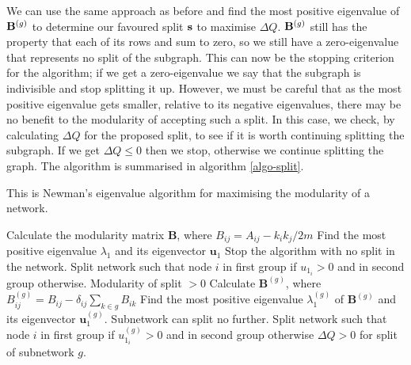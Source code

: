 We can use the same approach as before and find the most
positive eigenvalue of ${\bf B}^{(g)}$ to determine our favoured split
${\bf s}$ to maximise $\Delta Q$. ${\bf B}^{(g)}$ still has the
property that each of its rows and sum to zero, so we still have a
zero-eigenvalue that represents no split of the subgraph.  This can
now be the stopping criterion for the algorithm; if we get a
zero-eigenvalue we say that the subgraph is indivisible and stop
splitting it up.  However, we must be careful that as the most
positive eigenvalue gets smaller, relative to its negative
eigenvalues, there may be no benefit to the modularity of accepting
such a split.  In this case, we check, by calculating $\Delta Q$ for
the proposed split, to see if it is worth continuing splitting the subgraph.
If we get $\Delta Q \leq 0$ then we stop, otherwise we continue
splitting the graph.  The algorithm is summarised in algorithm \ref{algo-split}.

\begin{algorithm}
\caption{This is Newman's eigenvalue algorithm for maximising the modularity of a network.}
\label{algo-split}
\begin{algorithmic}
\STATE Calculate the modularity matrix $\mathbf{B}$, where $B_{ij} = A_{ij} - k_ik_j/2m$
\STATE Find the most positive eigenvalue $\lambda_1$ and its eigenvector $\mathbf{u}_1$
\STATE Stop the algorithm with no split in the network.
\ELSE
\STATE Split network such that node $i$ in first group if $u_{1_{i}} > 0$ and in second group otherwise.
\ENSURE Modularity of split $> 0$
\ENDIF
{}
\STATE Calculate $\mathbf{B}^{(g)}$, where $B^{(g)}_{ij} = B_{ij} - \delta_{ij}\sum_{k\in g}B_{ik}$
\STATE Find the most positive eigenvalue $\lambda^{(g)}_1$ of $\mathbf{B}^{(g)}$ and its eigenvector $\mathbf{u}^{(g)}_1$.
\STATE Subnetwork can split no further.
\ELSE
\STATE Split network such that node $i$ in first group if $u^{(g)}_{1_{i}} > 0$ and in second group otherwise
\ENSURE $\Delta Q > 0$ for split of subnetwork $g$.
\ENDIF
\ENDFOR
\end{algorithmic}
\end{algorithm}



